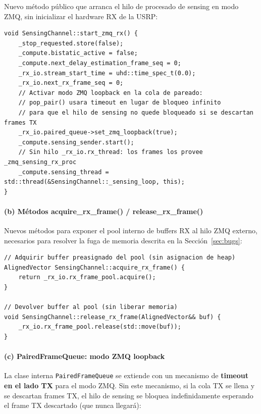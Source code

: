 \documentclass[11pt,a4paper]{article}
\begin{document}
Nuevo método público que arranca el hilo de procesado de sensing en modo ZMQ,
sin inicializar el hardware RX de la USRP:

\begin{lstlisting}[style=cpp,
  caption={start\_zmq\_rx() — SensingChannel.cpp, líneas 891--903}]
void SensingChannel::start_zmq_rx() {
    _stop_requested.store(false);
    _compute.bistatic_active = false;
    _compute.next_delay_estimation_frame_seq = 0;
    _rx_io.stream_start_time = uhd::time_spec_t(0.0);
    _rx_io.next_rx_frame_seq = 0;
    // Activar modo ZMQ loopback en la cola de pareado:
    // pop_pair() usara timeout en lugar de bloqueo infinito
    // para que el hilo de sensing no quede bloqueado si se descartan frames TX
    _rx_io.paired_queue->set_zmq_loopback(true);
    _compute.sensing_sender.start();
    // Sin hilo _rx_io.rx_thread: los frames los provee _zmq_sensing_rx_proc
    _compute.sensing_thread = std::thread(&SensingChannel::_sensing_loop, this);
}
\end{lstlisting}

\paragraph{(b) Métodos acquire\_rx\_frame() / release\_rx\_frame()}

Nuevos métodos para exponer el pool interno de buffers RX al hilo ZMQ externo,
necesarios para resolver la fuga de memoria descrita en la Sección~\ref{sec:bugs}:

\begin{lstlisting}[style=cpp,
  caption={Nuevos métodos de pool — SensingChannel.cpp / SensingChannel.hpp}]
// Adquirir buffer preasignado del pool (sin asignacion de heap)
AlignedVector SensingChannel::acquire_rx_frame() {
    return _rx_io.rx_frame_pool.acquire();
}

// Devolver buffer al pool (sin liberar memoria)
void SensingChannel::release_rx_frame(AlignedVector&& buf) {
    _rx_io.rx_frame_pool.release(std::move(buf));
}
\end{lstlisting}

\paragraph{(c) PairedFrameQueue: modo ZMQ loopback}

La clase interna \texttt{PairedFrameQueue} se extiende con un mecanismo de
\textbf{timeout en el lado TX} para el modo ZMQ. Sin este mecanismo, si la cola TX
se llena y se descartan frames TX, el hilo de sensing se bloquea indefinidamente
esperando el frame TX descartado (que nunca llegará):
\end{document}
